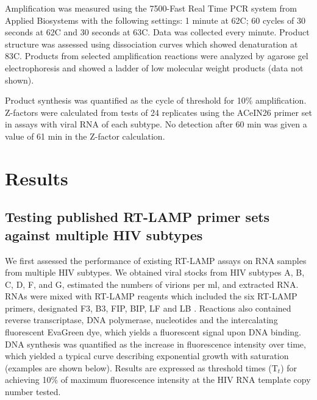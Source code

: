 \documentclass[../sherrill-Mix_thesis.tex]{subfiles}
\begin{document}
	Amplification was measured using the 7500-Fast Real Time PCR system from Applied Biosystems with the following settings: 1 minute at 62\degree{}C; 60 cycles of 30 seconds at 62\degree{}C and 30 seconds at 63\degree{}C. Data was collected every minute. Product structure was assessed using dissociation curves which showed denaturation at 83\degree{}C. Products from selected amplification reactions were analyzed by agarose gel electrophoresis and showed a ladder of low molecular weight products (data not shown).

	Product synthesis was quantified as the cycle of threshold for 10\% amplification. Z-factors \citep{Zhang1999} were calculated from tests of 24 replicates using the ACeIN26 primer set in assays with viral RNA of each subtype. No detection after 60 min was given a value of 61 min in the Z-factor calculation.


\section{Results}
	\subsection{Testing published RT-LAMP primer sets against multiple HIV subtypes}

	We first assessed the performance of existing RT-LAMP assays on RNA samples from multiple HIV subtypes. We obtained viral stocks from HIV subtypes A, B, C, D, F, and G, estimated the numbers of virions per ml, and extracted RNA. RNAs were mixed with RT-LAMP reagents which included the six RT-LAMP primers, designated F3, B3, FIP, BIP, LF and LB \citep{Notomi2000}. Reactions also contained reverse transcriptase, DNA polymerase, nucleotides and the intercalating fluorescent EvaGreen dye, which yields a fluorescent signal upon DNA binding. DNA synthesis was quantified as the increase in fluorescence intensity over time, which yielded a typical curve describing exponential growth with saturation (examples are shown below). Results are expressed as threshold times (T$_t$) for achieving 10\% of maximum fluorescence intensity at the HIV RNA template copy number tested.
\end{document}
